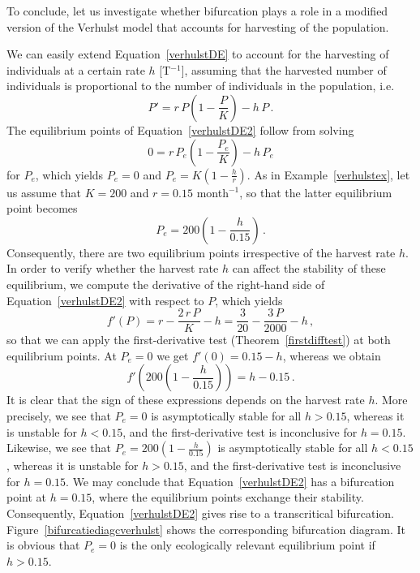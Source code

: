 To conclude, let us investigate whether bifurcation plays a role in a modified version of the Verhulst model that accounts for harvesting of the population.

\begin{example}
\label{exbifverhulst}
We can easily extend Equation~\eqref{verhulstDE} to account for the harvesting of individuals at a certain rate $h$ [T$^{-1}$], assuming that the harvested number of individuals is proportional to the number of individuals in the population, i.e.
\begin{equation}
	P'=r\,P\left(1-\dfrac{P}{K}\right)-h\,P\,.
\label{verhulstDE2}
\end{equation}
The equilibrium points of Equation~\eqref{verhulstDE2} follow from solving
$$
0=r\,P_e\left(1-\dfrac{P_e}{K}\right)-h\,P_e
$$
for $P_e$, which yields $P_e=0$ and $P_e=K\left(1-\frac{h}{r}\right)$. As in Example~\ref{verhulstex}, let us assume that $K=200$ and $r=0.15$ month$^{-1}$, so that the latter equilibrium point becomes 
$$
P_e=200\left(1-\frac{h}{0.15}\right)\,.
$$
Consequently, there are two equilibrium points irrespective of the harvest rate $h$. In order to verify whether the harvest rate $h$ can affect the stability of these equilibrium, we compute the derivative of the right-hand side of Equation~\eqref{verhulstDE2} with respect to $P$, which yields
$$
f'(P)=r-\frac{2\,r\,P}{K}-h=\frac{3}{20}-\frac{3\,P}{2000}-h\,,
$$
so that we can apply the first-derivative test (Theorem~\ref{firstdifftest}) at both equilibrium points. At $P_e=0$ we get $f'(0)=0.15-h$, whereas we obtain 
$$
f'\left(200\left(1-\frac{h}{0.15}\right)\right)=h-0.15\,.
$$
It is clear that the sign of these expressions depends on the harvest rate $h$. More precisely, we see that $P_e=0$ is asymptotically stable for all $h>0.15$, whereas it is unstable for $h<0.15$, and the first-derivative test is inconclusive for $h=0.15$. Likewise, we see that $P_e=200\left(1-\frac{h}{0.15}\right)$ is asymptotically stable for all $h<0.15$, whereas it is unstable for $h>0.15$, and the first-derivative test is inconclusive for $h=0.15$. We may conclude that Equation~\eqref{verhulstDE2} has a bifurcation point at $h=0.15$, where the equilibrium points exchange their stability. Consequently, Equation~\eqref{verhulstDE2} gives rise to a transcritical bifurcation. Figure~\ref{bifurcatiediagcverhulst} shows the corresponding bifurcation diagram. It is obvious that $P_e=0$ is the only ecologically relevant equilibrium point if $h>0.15$.


\end{example}
